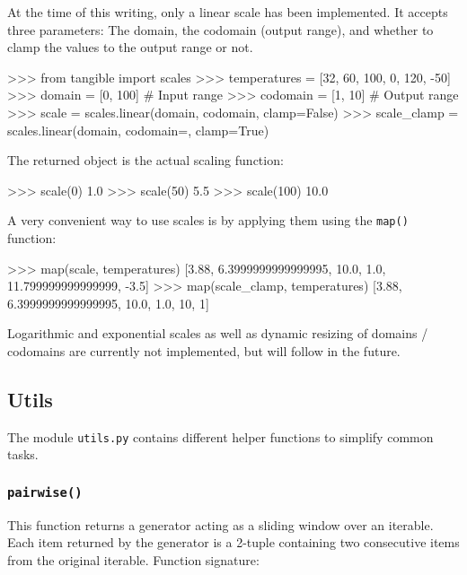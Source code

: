At the time of this writing, only a linear scale has been implemented. It
accepts three parameters: The domain, the codomain (output range), and whether
to clamp the values to the output range or not.

\vspace{.5\baselineskip}
\begin{pythoncode}
>>> from tangible import scales
>>> temperatures = [32, 60, 100, 0, 120, -50]
>>> domain = [0, 100]  # Input range
>>> codomain = [1, 10]  # Output range
>>> scale = scales.linear(domain, codomain, clamp=False)
>>> scale_clamp = scales.linear(domain, codomain=, clamp=True)
\end{pythoncode}

\noindent The returned object is the actual scaling function:

\vspace{.5\baselineskip}
\begin{pythoncode}
>>> scale(0)
1.0
>>> scale(50)
5.5
>>> scale(100)
10.0
\end{pythoncode}

\noindent A very convenient way to use scales is by applying them using the
\texttt{map()} function:

\vspace{.5\baselineskip}
\begin{pythoncode}
>>> map(scale, temperatures)
[3.88, 6.3999999999999995, 10.0, 1.0, 11.799999999999999, -3.5]
>>> map(scale_clamp, temperatures)
[3.88, 6.3999999999999995, 10.0, 1.0, 10, 1]
\end{pythoncode}

\noindent Logarithmic and exponential scales as well as dynamic resizing of
domains / codomains are currently not implemented, but will follow in the
future.

\subsection{Utils}

The module \texttt{utils.py} contains different helper functions to simplify
common tasks.

\subsubsection{\texttt{pairwise()}}

\noindent This function returns a generator acting as a sliding window over an iterable.
Each item returned by the generator is a 2-tuple containing two consecutive
items from the original iterable. Function signature:

